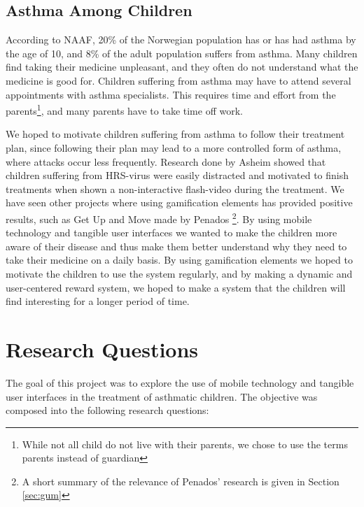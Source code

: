 \subsection{Asthma Among Children}
\label{sec:asthmaamongchildren}
According to NAAF, 20\% of the Norwegian population has or has had asthma by the age of 10, and 8\% of the adult population suffers from asthma\cite{NAAFStat}. Many children find taking their medicine unpleasant, and they often do not understand what the medicine is good for. Children suffering from asthma may have to attend several appointments with asthma specialists. This requires time and effort from the parents\footnote{While not all child do not live with their parents, we chose to use the terms parents instead of guardian}, and many parents have to take time off work. 

We hoped to motivate children suffering from asthma to follow their treatment plan, since following their plan may lead to a more controlled form of asthma, where attacks occur less frequently\cite{ginasthma}. 
Research done by Asheim showed that children suffering from HRS-virus were easily distracted and motivated to finish treatments when shown a non-interactive flash-video during the treatment\cite{asheim2012konsept}. We have seen other projects where using gamification elements has provided positive results, such as Get Up and Move made by Penados \etal{}\cite{penadosget}\footnote{A short summary of the relevance of Penados' research is given in Section \ref{sec:gum}}. 
By using mobile technology and tangible user interfaces we wanted to make the children more aware of their disease and thus make them better understand why they need to take their medicine on a daily basis. 
By using gamification elements we hoped to motivate the children to use the system regularly, and by making a dynamic and user-centered reward system, we hoped to make a system that the children will find interesting for a longer period of time.  



\section{Research Questions}
\label{sec:researchquestions}
The goal of this project was to explore the use of mobile technology and tangible user interfaces in the treatment of asthmatic children. The objective was composed into the following research questions: 

